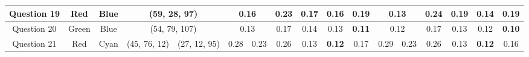 \begin{table}[!htbp]
{\begin{tabular}{@{}cccccclccccclcccc@{}}
    \multicolumn{1}{c|}{Question 19} & \multicolumn{1}{c|}{Red}     & \multicolumn{1}{c|}{Blue}    & \multicolumn{2}{c||}{\cellcolor[HTML]{FF00FF}(59, 28, 97)}                                                             & \multicolumn{2}{c|}{\cellcolor[HTML]{32CB00}\textbf{0.16}} & \multicolumn{1}{c|}{0.23}                                  & \multicolumn{1}{c|}{0.17}                                  & \multicolumn{1}{c|}{\cellcolor[HTML]{32CB00}\textbf{0.16}} & \multicolumn{1}{c||}{0.19}                                  & \multicolumn{2}{c|}{\cellcolor[HTML]{32CB00}\textbf{0.13}} & \multicolumn{1}{c|}{0.24}                                  & \multicolumn{1}{c|}{0.19}                                  & \multicolumn{1}{c|}{0.14}                                  & \multicolumn{1}{c|}{0.19}                                  \\ \midrule
    \multicolumn{1}{c|}{Question 20} & \multicolumn{1}{c|}{Green}   & \multicolumn{1}{c|}{Blue}    & \multicolumn{2}{c||}{\cellcolor[HTML]{00FFFF}(54, 79, 107)}                                                            & \multicolumn{2}{c|}{0.13}                                  & \multicolumn{1}{c|}{0.17}                                  & \multicolumn{1}{c|}{0.14}                                  & \multicolumn{1}{c|}{0.13}                                  & \multicolumn{1}{c||}{\cellcolor[HTML]{32CB00}\textbf{0.11}} & \multicolumn{2}{c|}{0.12}                                  & \multicolumn{1}{c|}{0.17}                                  & \multicolumn{1}{c|}{0.13}                                  & \multicolumn{1}{c|}{0.12}                                  & \multicolumn{1}{c|}{\cellcolor[HTML]{32CB00}\textbf{0.10}} \\ \midrule
    \multicolumn{1}{c|}{Question 21} & \multicolumn{1}{c|}{Red}     & \multicolumn{1}{c|}{Cyan}    & \multicolumn{1}{c||}{\cellcolor[HTML]{80FF00}(45, 76, 12)} & \multicolumn{1}{c||}{\cellcolor[HTML]{7F00FF}(27, 12, 95)} & \multicolumn{1}{c|}{0.28}    & \multicolumn{1}{l|}{0.23}   & \multicolumn{1}{c|}{0.26}                                  & \multicolumn{1}{c|}{0.13}                                  & \multicolumn{1}{c|}{\cellcolor[HTML]{32CB00}\textbf{0.12}} & \multicolumn{1}{c||}{0.17}                                  & \multicolumn{1}{c|}{0.29}    & \multicolumn{1}{l|}{0.23}   & \multicolumn{1}{c|}{0.26}                                  & \multicolumn{1}{c|}{0.13}                                  & \multicolumn{1}{c|}{\cellcolor[HTML]{32CB00}\textbf{0.12}} & \multicolumn{1}{c|}{0.16}                                  \\ \midrule

\end{tabular}}
\end{table}
